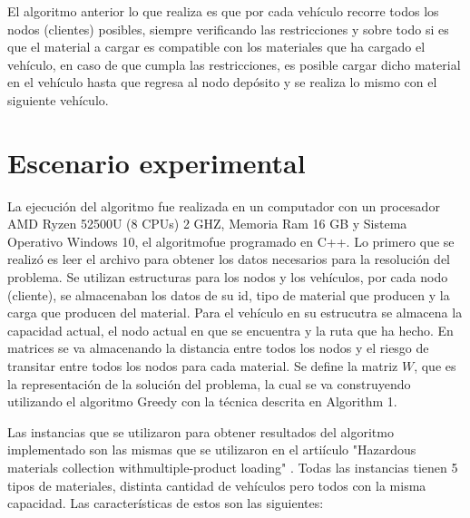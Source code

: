 \documentclass[conference]{IEEEtran}
\begin{document}
El algoritmo anterior lo que realiza es que por cada veh\'iculo recorre todos los nodos (clientes) posibles, siempre verificando las restricciones y sobre todo si es que el material a cargar es compatible con los materiales que ha cargado el veh\'iculo, en caso de que cumpla las restricciones, es posible cargar dicho material en el veh\'iculo hasta que regresa al nodo dep\'osito y se realiza lo mismo con el siguiente veh\'iculo.

\section{Escenario experimental}

La ejecuci\'on del algoritmo fue realizada en un computador con un procesador AMD Ryzen 52500U (8 CPUs) 2 GHZ, Memoria Ram 16 GB y Sistema Operativo Windows 10, el algoritmofue programado en C++. Lo primero que se realiz\'o es leer el archivo para obtener los datos necesarios para la resoluci\'on del problema. Se utilizan estructuras para los nodos y los veh\'iculos, por cada nodo (cliente), se almacenaban los datos de su id, tipo de material que producen y la carga que producen del material. Para el veh\'iculo en su estrucutra se almacena la capacidad actual, el nodo actual en que se encuentra y la ruta que ha hecho. En matrices se va almacenando la distancia entre todos los nodos y el riesgo de transitar entre todos los nodos para cada material. Se define la matriz $W$, que es la representaci\'on de la soluci\'on del problema, la cual se va construyendo utilizando el algoritmo Greedy con la t\'ecnica descrita en Algorithm 1.

Las instancias que se utilizaron para obtener resultados del algoritmo implementado son las mismas que se utilizaron en el arti\'iculo "Hazardous    materials    collection    withmultiple-product  loading" \cite{b2}. Todas las instancias tienen 5 tipos de materiales, distinta cantidad de veh\'iculos pero todos con la misma capacidad.  Las caracter\'isticas de estos son las siguientes:
\end{document}

